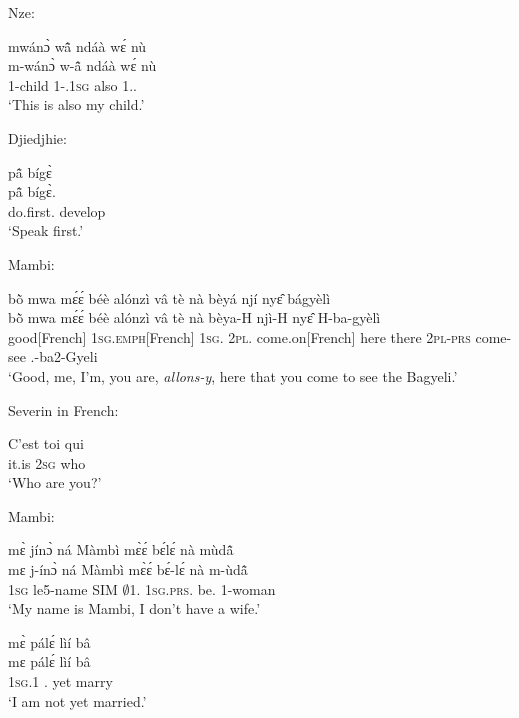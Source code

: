 \noindent Nze:

\begin{exe}[(C234)]  
\exC\label{88} 
  \glll  mwánɔ̀ wã̂ ndáà wɛ́ nù \\
      m-wánɔ̀ w-ã̂ ndáà wɛ́ nù \\
         {\N}1-child  1-{\POSS}.1\textsc{sg} also {\ID} 1.{\DEM}.{\PROX}  \\
    \trans `This is also my child.'
\end{exe}

\noindent Djiedjhie:

\begin{exe}[(C234)]  
\exC\label{89}
  \glll pã̂ bígɛ̀  \\
        pã̂ bígɛ̀.  \\
         do.first.{\IMP}   develop \\
    \trans `Speak first.'
\end{exe}

\noindent Mambi:

\begin{exe}[(C234)]  
\exC\label{90}
  \glll bõ̀ mwa mɛ́ɛ́ béè alónzì vâ tè nà bèyá njí nyɛ̂ bágyèlì \\
      bõ̀ mwa mɛ́ɛ́ béè alónzì vâ tè nà bèya-H njì-H nyɛ̂ H-ba-gyèlì \\
         good[French] 1\textsc{sg}.\textsc{emph}[French] 1\textsc{sg}.{\COP} 2\textsc{pl}.{\COP} come.on[French] here there {\CONJ} 2\textsc{pl}-\textsc{prs} come-{\R} see {\OBJ}.{\LINK}-ba2-Gyeli   \\
    \trans `Good, me, I'm, you are, {\itshape allons-y}, here that you come to see the Bagyeli.'
\end{exe}

\noindent Severin in French:

\begin{exe}[(C234)]  
\exC\label{91} 
  \gll  C'est toi qui \\
         it.is 2\textsc{sg} who   \\
    \trans `Who are you?'
\end{exe}

\noindent Mambi:

\begin{exe}[(C234)]  
\exC\label{92} 
  \glll mɛ̀ jínɔ̀ ná Màmbì mɛ̀ɛ́ bɛ́lɛ́ nà mùdã̂  \\
      mɛ j-ínɔ̀ ná Màmbì mɛ̀ɛ́ bɛ́-lɛ́ nà m-ùdã̂  \\
         1\textsc{sg} le5-name SIM $\emptyset$1.{\PN} 1\textsc{sg}.\textsc{prs}.{\NEG} be.{\NEG} {\COM} {\N}1-woman   \\
    \trans `My name is Mambi, I don't have a wife.'
 
\exC\label{93}
  \glll  mɛ̀ pálɛ́ lìí bâ \\
          mɛ pálɛ́ lìí bâ \\
           1\textsc{sg}.{\PST}1 {\NEG}.{\PST}  yet marry \\
    \trans `I am not yet married.'
\end{exe}

